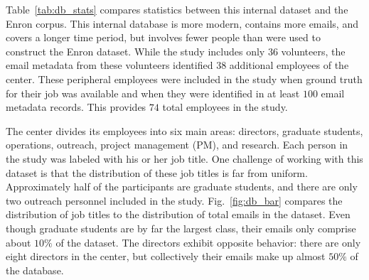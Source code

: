 \documentclass[10pt,twocolumn,conference]{IEEEtran}
\begin{document}
Table~\ref{tab:db_stats} compares statistics between this internal dataset and the Enron corpus.
This internal database is more modern, contains more emails, and covers a longer time period, but involves fewer people than were used to construct the Enron dataset.
While the study includes only 36 volunteers, the email metadata from these volunteers identified $38$ additional employees of the center.
These peripheral employees were included in the study when ground truth for their job was available and when they were identified in at least $100$ email metadata records.
This provides $74$ total employees in the study.

\begin{table}[t]
\centering
\caption{A comparison between the internal dataset and the Enron email corpus.}
\label{tab:db_stats}
\end{table}


The center divides its employees into six main areas: directors, graduate students, operations, outreach, project management (PM), and research.
Each person in the study was labeled with his or her job title.
One challenge of working with this dataset is that the distribution of these job titles is far from uniform.
Approximately half of the participants are graduate students, and there are only two outreach personnel included in the study.
Fig.~\ref{fig:db_bar} compares the distribution of job titles to the distribution of total emails in the dataset.
Even though graduate students are by far the largest class, their emails only comprise about $10\%$ of the dataset.
The directors exhibit opposite behavior: there are only eight directors in the center, but collectively their emails make up almost $50\%$ of the database.
\end{document}
